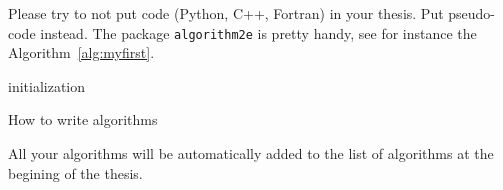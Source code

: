 Please try to not put code (Python, C++, Fortran) in your thesis.
Put pseudo-code instead.
The package \texttt{algorithm2e} is pretty handy, see for instance the Algorithm~\ref{alg:myfirst}.
\begin{algorithm}[h]
 initialization\;
 \caption{How to write algorithms}\label{alg:myfirst}
\end{algorithm}
All your algorithms will be automatically added to the list of algorithms at the begining of the thesis.
